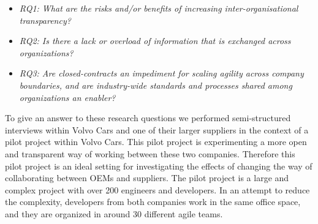 \begin{itemize}
\item {\em RQ1: What are the risks and/or benefits of increasing inter-organisational transparency?}
\item {\em RQ2: Is there a lack or overload of information that is exchanged across organizations?} 
\item {\em RQ3: Are closed-contracts an impediment for scaling agility across company boundaries, and 
are industry-wide standards and processes shared among organizations an enabler?} 
\end{itemize}

To give an answer to these research questions we performed semi-structured interviews within Volvo Cars and 
one of their larger suppliers in the context of a pilot project within Volvo Cars. This pilot project is experimenting a more open and transparent way of working between these two companies. Therefore this pilot project is an ideal setting for investigating the effects of changing the way of collaborating between OEMs and suppliers.  
The pilot project is a large and complex project with over 200 engineers and developers. 
In an attempt to reduce the complexity, developers from both companies work in the same office space, and they are organized in around 30 different agile teams. %

